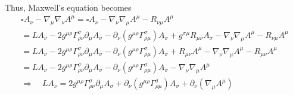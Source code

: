 \documentclass[12pt]{article}
\def\nn{\nonumber}
\begin{document}
Thus, Maxwell's equation becomes
\begin{gather}
\square A_{\nu}
-
\nabla_{\mu}
\nabla_{\nu}
A^{\mu}
=
\square A_{\nu}
-
\nabla_{\nu}
\nabla_{\mu}
A^{\mu}
-
R_{\nu \mu}
A^{\mu}
\nn \\
=
L A_{\nu}
-
2 g^{\mu \rho} \Gamma^{\sigma}_{\rho\nu}
\partial_{\mu}
A_{\sigma}
-
\partial_{\nu}
(g^{\mu \rho}
\Gamma^{\sigma}_{\rho\mu})
A_{\sigma}
+
g^{\sigma \mu}
R_{\mu \nu}
A_{\sigma}
-
\nabla_{\nu}
\nabla_{\mu}
A^{\mu}
-
R_{\nu \mu }
A^{\mu}
\nn \\
=
L A_{\nu}
-
2 g^{\mu \rho} \Gamma^{\sigma}_{\rho\nu}
\partial_{\mu}
A_{\sigma}
-
\partial_{\nu}
(g^{\mu \rho}
\Gamma^{\sigma}_{\rho\mu})
A_{\sigma}
+
R_{\mu \nu}
A^{\mu}
-
\nabla_{\nu}
\nabla_{\mu}
A^{\mu}
-
R_{\mu \nu}
A^{\mu}
\nn \\
=
L A_{\nu}
-
2 g^{\mu \rho} \Gamma^{\sigma}_{\rho\nu}
\partial_{\mu}
A_{\sigma}
-
\partial_{\nu}
(g^{\mu \rho}
\Gamma^{\sigma}_{\rho\mu})
A_{\sigma}
-
\nabla_{\nu}
\nabla_{\mu}
A^{\mu}
\nn \\
\Rightarrow
\quad
L A_{\nu}
=
2 g^{\mu \rho} \Gamma^{\sigma}_{\rho\nu}
\partial_{\mu}
A_{\sigma}
+
\partial_{\nu}
(g^{\mu \rho}
\Gamma^{\sigma}_{\rho\mu})
A_{\sigma}
+
\partial_{\nu}
(\nabla_{\mu}
A^{\mu})
\end{gather}




\end{document}
